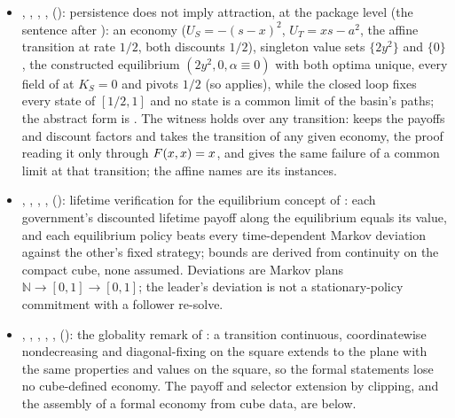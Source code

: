 \begin{itemize}[leftmargin=1.4em,itemsep=1pt]
\item {}, , , ,  (): persistence does not imply attraction, at the package level (the sentence after ): an economy ($U_S=-(s-x)^2$, $U_T=xs-a^2$, the affine transition at rate $1/2$, both discounts $1/2$), singleton value sets $\{2y^2\}$ and $\{0\}$, the constructed equilibrium $(2y^2,0,\alpha\equiv0)$ with both optima unique, every field of  at $K_S=0$ and pivots $1/2$ (so  applies), while the closed loop fixes every state of $[1/2,1]$ and no state is a common limit of the basin's paths; the abstract form is . The witness holds over any transition:  keeps the payoffs and discount factors and takes the transition of any given economy, the proof reading it only through $F(x,x)=x$, and  gives the same failure of a common limit at that transition; the affine names are its instances.
\item {}, , , ,  (): lifetime verification for the equilibrium concept of : each government's discounted lifetime payoff along the equilibrium equals its value, and each equilibrium policy beats every time-dependent Markov deviation against the other's fixed strategy; bounds are derived from continuity on the compact cube, none assumed. Deviations are Markov plans $\mathbb N\to[0,1]\to[0,1]$; the leader's deviation is not a stationary-policy commitment with a follower re-solve.
\item {}, , , , ,  (): the globality remark of : a transition continuous, coordinatewise nondecreasing and diagonal-fixing on the square extends to the plane with the same properties and values on the square, so the formal statements lose no cube-defined economy. The payoff and selector extension by clipping, and the assembly of a formal economy from cube data, are  below.

\end{itemize}
